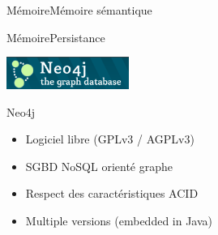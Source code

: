 \begin{frame}{Mémoire}{Mémoire sémantique}
\end{frame}

\begin{frame}{Mémoire}{Persistance}
\begin{center}
\includegraphics[width=0.3\textwidth]{img/neo4j/neo4j_logo}
\end{center}
\begin{block}{Neo4j}
\begin{itemize}
\item Logiciel libre (GPLv3 / AGPLv3)
\item SGBD NoSQL orienté graphe
\item Respect des caractéristiques ACID
\item Multiple versions (embedded in Java)
\end{itemize}
\end{block}
\end{frame}


